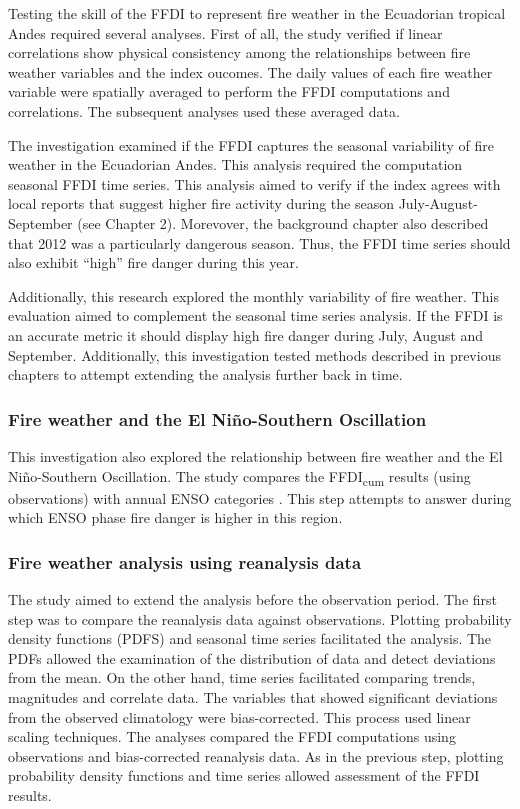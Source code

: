 Testing the skill of the FFDI to represent fire weather in the Ecuadorian
tropical Andes required several analyses. First of all, the study
verified if linear correlations show physical consistency among the
relationships between fire weather variables and the index oucomes.
The daily values of each fire weather variable were spatially averaged
to perform the FFDI computations and correlations. The subsequent
analyses used these averaged data. 

The investigation examined if the FFDI captures the seasonal variability
of fire weather in the Ecuadorian Andes. This analysis required the
computation seasonal FFDI time series. This analysis aimed to verify
if the index agrees with local reports that suggest higher fire activity
during the season July-August-September (see Chapter 2). Morevover,
the background chapter also described that 2012 was a particularly
dangerous season. Thus, the FFDI time series should also exhibit ``high''
fire danger during this year. 

Additionally, this research explored the monthly variability of fire
weather. This evaluation aimed to complement the seasonal time series
analysis. If the FFDI is an accurate metric it should display high
fire danger during July, August and September. Additionally, this
investigation tested methods described in previous chapters to attempt
extending the analysis further back in time. 


\subsubsection{Fire weather and the El Ni\~no-Southern Oscillation}

This investigation also explored the relationship between fire weather
and the El Ni\~no-Southern Oscillation. The study compares the FFDI\textsubscript{cum}
results (using observations) with annual ENSO categories \citep{BoM-ENSO-Years-2016}.
This step attempts to answer during which ENSO phase fire danger is
higher in this region. 


\subsubsection{Fire weather analysis using reanalysis data}

The study aimed to extend the analysis before the observation period.
The first step was to compare the reanalysis data against observations.
Plotting probability density functions (PDFS) and seasonal time series
facilitated the analysis. The PDFs allowed the examination of the
distribution of data and detect deviations from the mean. On the other
hand, time series facilitated comparing trends, magnitudes and correlate
data. The variables that showed significant deviations from the observed
climatology were bias-corrected. This process used linear scaling
techniques. The analyses compared the FFDI computations using observations
and bias-corrected reanalysis data. As in the previous step, plotting
probability density functions and time series allowed assessment of
the FFDI results. 


